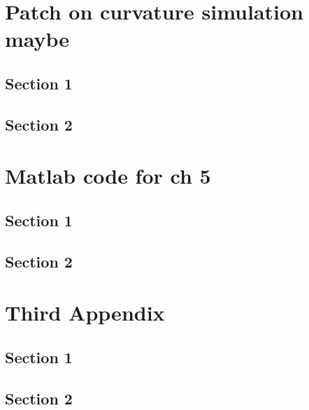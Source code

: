 \appendix
\chapter{Patch on curvature simulation maybe}\label{app:}
  \section{Section 1}\label{sec:}
    \lipsum[34-36]
  \section{Section 2}\label{sec:}
    \lipsum[38]

\chapter{Matlab code for ch 5}\label{app:1}
  \section{Section 1}\label{sec:1}
    \lipsum[34-36]
  \section{Section 2}\label{sec:2}
    \lipsum[38]

\chapter{Third Appendix}\label{app:2}
  \section{Section 1}\label{sec:3}
    
  \section{Section 2}\label{sec:4}
    
    
    

